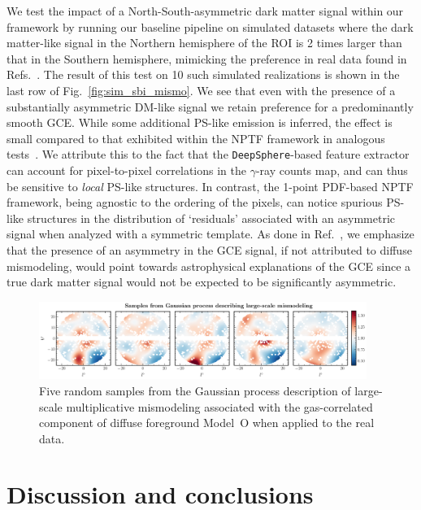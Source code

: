 \documentclass[prd,aps,10pt,nofootinbib,twocolumn,superscriptaddress,preprintnumbers,balancelastpage,longbibliography,floatfix]{revtex4-2}
\begin{document}
We test the impact of a North-South-asymmetric dark matter signal within our framework by running our baseline pipeline on simulated datasets where the dark matter-like signal in the Northern hemisphere of the ROI is 2 times larger than that in the Southern hemisphere, mimicking the preference in real data found in Refs.~\cite{Leane:2020nmi,Leane:2020pfc}. The result of this test on 10 such simulated realizations is shown in the last row of Fig.~\ref{fig:sim_sbi_mismo}. We see that even with the presence of a substantially asymmetric DM-like signal we retain preference for a predominantly smooth GCE. While some additional PS-like emission is inferred, the effect is small compared to that exhibited within the NPTF framework in analogous tests~\cite{Leane:2020nmi,Leane:2020pfc}. We attribute this to the fact that the \texttt{DeepSphere}-based feature extractor can account for pixel-to-pixel correlations in the $\gamma$-ray counts map, and can thus be sensitive to \emph{local} PS-like structures. In contrast, the 1-point PDF-based NPTF framework, being agnostic to the ordering of the pixels, can notice spurious PS-like structures in the distribution of `residuals' associated with an asymmetric signal when analyzed with a symmetric template.
As done in Ref.~\cite{Buschmann:2020adf}, we emphasize that the presence of an asymmetry in the GCE signal, if not attributed to diffuse mismodeling, would point towards astrophysical explanations of the GCE since a true dark matter signal would not be expected to be significantly asymmetric.


%
\begin{figure}[!htbp]
\centering
\includegraphics[width=0.95\textwidth]{plots/dd_mismo_map.pdf}
\caption{Five random samples from the Gaussian process description of large-scale multiplicative mismodeling associated with the gas-correlated component of diffuse foreground {Model~O} when applied to the real \Fermi data.}
\label{fig:dd_mismo_map}
\end{figure}
%

\section{Discussion and conclusions}
\label{sec:conclusion}
\end{document}
